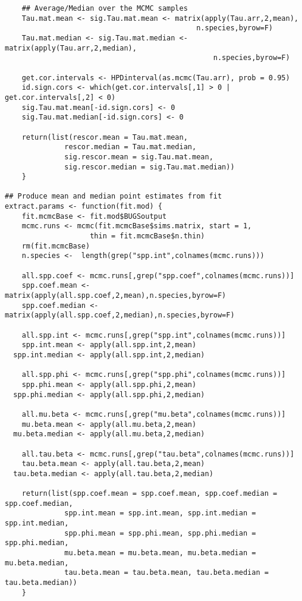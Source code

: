 \begin{verbatim}
	## Average/Median over the MCMC samples
	Tau.mat.mean <- sig.Tau.mat.mean <- matrix(apply(Tau.arr,2,mean),
                                             n.species,byrow=F)
	Tau.mat.median <- sig.Tau.mat.median <- matrix(apply(Tau.arr,2,median),
                                                 n.species,byrow=F)
		
	get.cor.intervals <- HPDinterval(as.mcmc(Tau.arr), prob = 0.95)	
	id.sign.cors <- which(get.cor.intervals[,1] > 0 | get.cor.intervals[,2] < 0)	
	sig.Tau.mat.mean[-id.sign.cors] <- 0
	sig.Tau.mat.median[-id.sign.cors] <- 0
		
	return(list(rescor.mean = Tau.mat.mean, 
              rescor.median = Tau.mat.median, 
              sig.rescor.mean = sig.Tau.mat.mean, 
              sig.rescor.median = sig.Tau.mat.median))
	}
	
## Produce mean and median point estimates from fit
extract.params <- function(fit.mod) {
	fit.mcmcBase <- fit.mod$BUGSoutput
	mcmc.runs <- mcmc(fit.mcmcBase$sims.matrix, start = 1, 
                    thin = fit.mcmcBase$n.thin) 
	rm(fit.mcmcBase)
	n.species <-  length(grep("spp.int",colnames(mcmc.runs)))

	all.spp.coef <- mcmc.runs[,grep("spp.coef",colnames(mcmc.runs))]
	spp.coef.mean <- matrix(apply(all.spp.coef,2,mean),n.species,byrow=F)	
	spp.coef.median <- matrix(apply(all.spp.coef,2,median),n.species,byrow=F)	
	
	all.spp.int <- mcmc.runs[,grep("spp.int",colnames(mcmc.runs))]
	spp.int.mean <- apply(all.spp.int,2,mean)
  spp.int.median <- apply(all.spp.int,2,median)	
	
	all.spp.phi <- mcmc.runs[,grep("spp.phi",colnames(mcmc.runs))]
	spp.phi.mean <- apply(all.spp.phi,2,mean)
  spp.phi.median <- apply(all.spp.phi,2,median)	

	all.mu.beta <- mcmc.runs[,grep("mu.beta",colnames(mcmc.runs))]
	mu.beta.mean <- apply(all.mu.beta,2,mean)
  mu.beta.median <- apply(all.mu.beta,2,median)	

	all.tau.beta <- mcmc.runs[,grep("tau.beta",colnames(mcmc.runs))]
	tau.beta.mean <- apply(all.tau.beta,2,mean)
  tau.beta.median <- apply(all.tau.beta,2,median)	

	return(list(spp.coef.mean = spp.coef.mean, spp.coef.median = spp.coef.median, 
              spp.int.mean = spp.int.mean, spp.int.median = spp.int.median, 
              spp.phi.mean = spp.phi.mean, spp.phi.median = spp.phi.median, 
              mu.beta.mean = mu.beta.mean, mu.beta.median = mu.beta.median, 
              tau.beta.mean = tau.beta.mean, tau.beta.median = tau.beta.median))
	}
\end{verbatim}